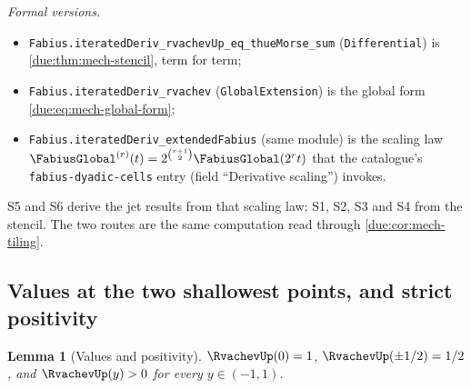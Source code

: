 \documentclass[11pt,oneside]{article}
\theoremstyle{plain}
\newtheorem{lemma}[theorem]{Lemma}
\theoremstyle{definition}
\theoremstyle{remark}
\begin{document}
\emph{Formal versions.}
\begin{sloppypar}
\begin{itemize}
\item \texttt{Fabius.\allowbreak iteratedDeriv\_\allowbreak rvachevUp\_\allowbreak eq\_\allowbreak thueMorse\_\allowbreak sum}
(\texttt{Differential}) is \cref{due:thm:mech-stencil}, term for term;
\item \texttt{Fabius.\allowbreak iteratedDeriv\_\allowbreak rvachev} (\texttt{GlobalExtension}) is
the global form \cref{due:eq:mech-global-form};
\item \texttt{Fabius.\allowbreak iteratedDeriv\_\allowbreak extendedFabius} (same module) is the
scaling law \(\FabiusGlobal^{(r)}(t)=2^{\binom{r+1}{2}}\FabiusGlobal(2^{r}t)\)
that the catalogue's \texttt{fabius-dyadic-cells} entry (field ``Derivative
scaling'') invokes.
\end{itemize}
\end{sloppypar}
S5 and S6 derive the jet results from that scaling law; S1, S2, S3 and S4
from the stencil.  The two routes are the same computation read through
\cref{due:cor:mech-tiling}.

\subsection{Values at the two shallowest points, and strict positivity}

\begin{lemma}[Values and positivity]
\label{due:lem:mech-values}
\(\RvachevUp(0)=1\), \(\RvachevUp(\pm1/2)=1/2\), and \(\RvachevUp(y)>0\) for
every \(y\in(-1,1)\).
\end{lemma}
\end{document}

